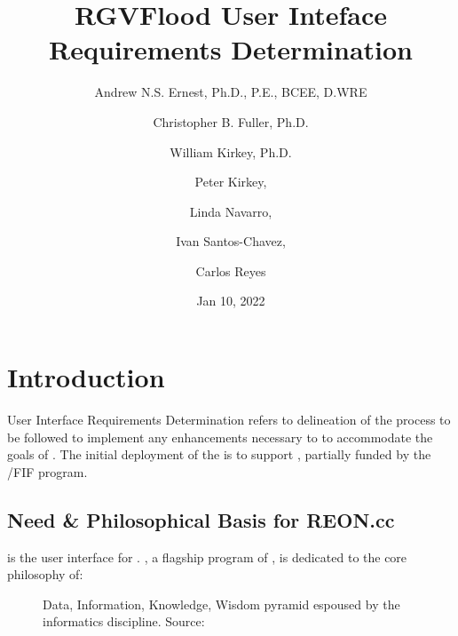 \documentclass[letterpaper,10pt,english]{sphinxmanual}
\title{RGVFlood User Inteface Requirements Determination}
\date{Jan 10, 2022}
\author{Andrew N.S. Ernest, Ph.D., P.E., BCEE, D.WRE \and Christopher B. Fuller, Ph.D. \and William Kirkey, Ph.D. \and Peter Kirkey, \and Linda Navarro, \and Ivan Santos-Chavez, \and Carlos Reyes}
\begin{document}
\pagestyle{empty}
\sphinxmaketitle
\pagestyle{plain}
\sphinxtableofcontents
\pagestyle{normal}
\label{\detokenize{requirements/index::doc}}



\chapter{Introduction}
\label{\detokenize{requirements/introduction/index:introduction}}\label{\detokenize{requirements/introduction/index::doc}}
\sphinxAtStartPar
User Interface Requirements Determination refers to delineation of the process to be followed to implement any enhancements necessary to  to accommodate the goals of . The initial deployment of the  is to support , partially funded by the /FIF program.


\section{Need \& Philosophical Basis for REON.cc}
\label{\detokenize{requirements/introduction/need:need-philosophical-basis-for-reon-cc}}\label{\detokenize{requirements/introduction/need::doc}}
\sphinxAtStartPar
{} is the user interface for . , a flagship program of , is dedicated to the core philosophy of:

\sphinxAtStartPar
{}

\begin{figure}[htbp]
\centering
\capstart

\noindent{}
\caption{Data, Information, Knowledge, Wisdom pyramid espoused by the informatics discipline. Source: }\label{\detokenize{requirements/introduction/need:id1}}\end{figure}
\end{document}
